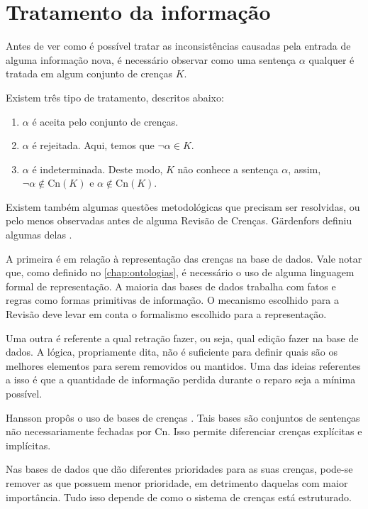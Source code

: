 \section{Tratamento da informação}

Antes de ver como é possível tratar as inconsistências causadas pela entrada de alguma informação nova, é necessário observar como uma sentença $ \alpha $ qualquer é tratada em algum conjunto de crenças $ K $.

Existem três tipo de tratamento, descritos abaixo:

\begin{enumerate}
	\item $ \alpha $ é aceita pelo conjunto de crenças.
	\item $ \alpha $ é rejeitada. Aqui, temos que $ \lnot \alpha \in K $. 
	\item $ \alpha $ é indeterminada. Deste modo, $ K $ não conhece a sentença $ \alpha $, assim, $ \lnot \alpha \notin \text{Cn}(K) $ e $ \alpha \notin \text{Cn}(K) $.
\end{enumerate}

Existem também algumas questões metodológicas que precisam ser resolvidas, ou pelo menos observadas antes de alguma Revisão de Crenças. Gärdenfors definiu algumas delas  \citep{revisaoGardenfors2}.

A primeira é em relação à representação das crenças na base de dados. Vale notar que, como definido no \autoref{chap:ontologias}, é necessário o uso de alguma linguagem formal de representação. A maioria das bases de dados trabalha com fatos e regras como formas primitivas de informação. O mecanismo escolhido para a Revisão deve levar em conta o formalismo escolhido para a representação.

Uma outra é referente a qual retração fazer, ou seja, qual edição fazer na base de dados. A lógica, propriamente dita, não é suficiente para definir quais são os melhores elementos para serem removidos ou mantidos. Uma das ideias referentes a isso é que a quantidade de informação perdida durante o reparo seja a mínima possível. 

Hansson propôs o uso de bases de crenças \citep{revisaoHansson6}. Tais bases são conjuntos de sentenças não necessariamente fechadas por Cn. Isso permite diferenciar crenças explícitas e implícitas.	

Nas bases de dados que dão diferentes prioridades para as suas crenças, pode-se remover as que possuem menor prioridade, em detrimento daquelas com maior importância. Tudo isso depende de como o sistema de crenças está estruturado.

